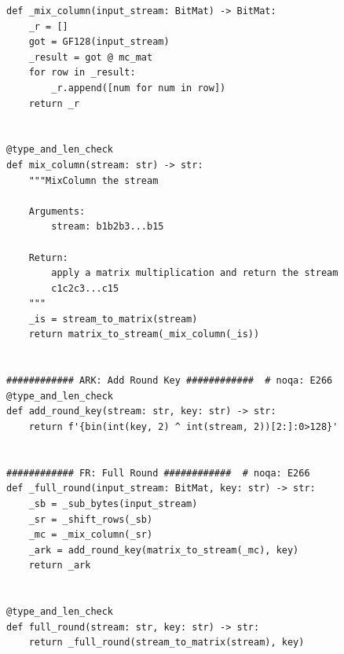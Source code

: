\documentclass[dvipsnames, svgnames, x11names]{article}
\begin{document}
\begin{latin}
\begin{lstlisting}
def _mix_column(input_stream: BitMat) -> BitMat:
    _r = []
    got = GF128(input_stream)
    _result = got @ mc_mat
    for row in _result:
        _r.append([num for num in row])
    return _r


@type_and_len_check
def mix_column(stream: str) -> str:
    """MixColumn the stream

    Arguments:
        stream: b1b2b3...b15

    Return:
        apply a matrix multiplication and return the stream
        c1c2c3...c15
    """
    _is = stream_to_matrix(stream)
    return matrix_to_stream(_mix_column(_is))


############ ARK: Add Round Key ############  # noqa: E266
@type_and_len_check
def add_round_key(stream: str, key: str) -> str:
    return f'{bin(int(key, 2) ^ int(stream, 2))[2:]:0>128}'


############ FR: Full Round ############  # noqa: E266
def _full_round(input_stream: BitMat, key: str) -> str:
    _sb = _sub_bytes(input_stream)
    _sr = _shift_rows(_sb)
    _mc = _mix_column(_sr)
    _ark = add_round_key(matrix_to_stream(_mc), key)
    return _ark


@type_and_len_check
def full_round(stream: str, key: str) -> str:
    return _full_round(stream_to_matrix(stream), key)
\end{lstlisting}
\end{latin}
\end{document}
